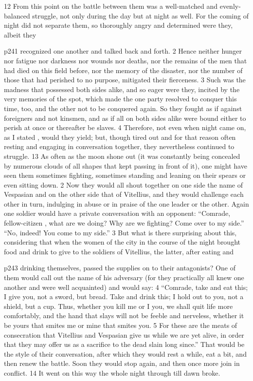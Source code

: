12
From this point on the battle between them was a well-matched and evenly-balanced struggle, not only during the day but at night as well. For the coming of night did not separate them, so thoroughly angry and determined were they, albeit they

p241 recognized one another and talked back and forth. 2 Hence neither hunger nor fatigue nor darkness nor wounds nor deaths, nor the remains of the men that had died on this field before, nor the memory of the disaster, nor the number of those that had perished to no purpose, mitigated their fierceness. 3 Such was the madness that possessed both sides alike, and so eager were they, incited by the very memories of the spot, which made the one party resolved to conquer this time, too, and the other not to be conquered again. So they fought as if against foreigners and not kinsmen, and as if all on both sides alike were bound either to perish at once or thereafter be slaves. 4 Therefore, not even when night came on, as I stated , would they yield; but, though tired out and for that reason often resting and engaging in conversation together, they nevertheless continued to struggle. 13
As often as the moon shone out (it was constantly being concealed by numerous clouds of all shapes that kept passing in front of it), one might have seen them sometimes fighting, sometimes standing and leaning on their spears or even sitting down. 2 Now they would all shout together on one side the name of Vespasian and on the other side that of Vitellius, and they would challenge each other in turn, indulging in abuse or in praise of the one leader or the other. Again one soldier would have a private conversation with an opponent: ``Comrade, fellow-citizen , what are we doing? Why are we fighting? Come over to my side.'' ``No, indeed! You come to my side.'' 3 But what is there surprising about this, considering that when the women of the city in the course of the night brought food and drink to give to the soldiers of Vitellius, the latter, after eating and

p243 drinking themselves, passed the supplies on to their antagonists? One of them would call out the name of his adversary (for they practically all knew one another and were well acquainted) and would say: 4 ``Comrade, take and eat this; I give you, not a sword, but bread. Take and drink this; I hold out to you, not a shield, but a cup. Thus, whether you kill me or I you, we shall quit life more comfortably, and the hand that slays will not be feeble and nerveless, whether it be yours that smites me or mine that smites you. 5 For these are the meats of consecration that Vitellius and Vespasian give us while we are yet alive, in order that they may offer us as a sacrifice to the dead slain long since.'' That would be the style of their conversation, after which they would rest a while, eat a bit, and then renew the battle. Soon they would stop again, and then once more join in conflict. 14 It went on this way the whole night through till dawn broke.

